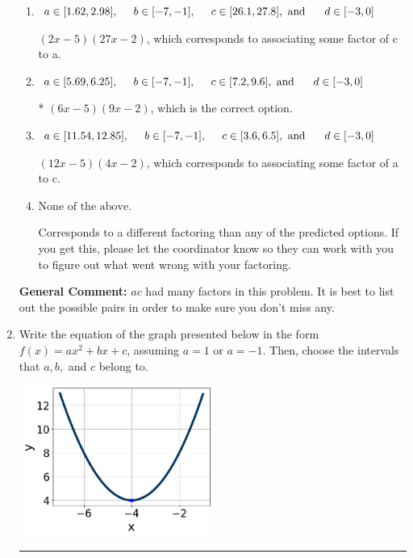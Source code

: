 \documentclass{extbook}[14pt]
\newcommand{\litem}[1]{\item #1

\rule{\textwidth}{0.4pt}}
\begin{document}
\begin{enumerate}
{\begin{enumerate}[label=\Alph*.]
 $(x -45)(x -12)$, which corresponds to factoring $x^{2} -57 x + 540$.
\item \( a \in [1.62, 2.98], \hspace*{5mm} b \in [-7, -1], \hspace*{5mm} c \in [26.1, 27.8], \text{ and } \hspace*{5mm} d \in [-3, 0] \)

 $(2x -5)(27x -2)$, which corresponds to associating some factor of c to a.
\item \( a \in [5.69, 6.25], \hspace*{5mm} b \in [-7, -1], \hspace*{5mm} c \in [7.2, 9.6], \text{ and } \hspace*{5mm} d \in [-3, 0] \)

* $(6x -5)(9x -2)$, which is the correct option.
\item \( a \in [11.54, 12.85], \hspace*{5mm} b \in [-7, -1], \hspace*{5mm} c \in [3.6, 6.5], \text{ and } \hspace*{5mm} d \in [-3, 0] \)

 $(12x -5)(4x -2)$, which corresponds to associating some factor of a to c.
\item \( \text{None of the above.} \)

 Corresponds to a different factoring than any of the predicted options. If you get this, please let the coordinator know so they can work with you to figure out what went wrong with your factoring.
\end{enumerate}

\textbf{General Comment:} $ac$ had many factors in this problem. It is best to list out the possible pairs in order to make sure you don't miss any.
}
\litem{
Write the equation of the graph presented below in the form $f(x)=ax^2+bx+c$, assuming  $a=1$ or $a=-1$. Then, choose the intervals that $a, b,$ and $c$ belong to.

\begin{center}
    \includegraphics[width=0.5\textwidth]{../Figures/quadraticGraphToEquationCopyC.png}
\end{center}


}
\end{enumerate}
\end{document}
